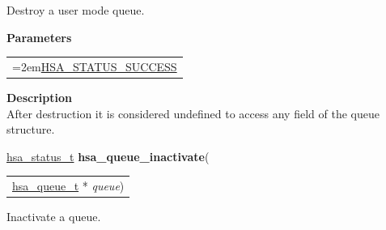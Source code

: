 \documentclass[final]{book}
\newcommand{\hsaarg}[1]{\textit{#1}}
\begin{document}
\begin{appendices}
\noindent{}
Destroy a user mode queue.

\noindent\textbf{Parameters}\\[-6mm]
\noindent\begin{longtable}{@{}>{\hangindent=2em}p{\textwidth}}
\hsaarg{queue}\\\hspace{2em}(in) Queue.
\end{longtable}
\vspace{-5mm}\noindent\textbf{Return Values}\\[-6mm]
\noindent\begin{longtable}{@{}>{\hangindent=2em}p{\linewidth}}
\hyperlink{group--status-1ggad755322e7ff95456520e8abdbe90d225ae382ea0c9c05cce5a60d0317375159cc}{HSA_STATUS_SUCCESS}
\end{longtable}
\vspace{-4mm}\noindent\textbf{Description}\\[1mm]
After destruction it is considered undefined to access any field of the queue structure. 


\noindent\begin{tcolorbox}[breakable,nobeforeafter,colframe=white,colback=lightgray,left=0mm]
\hyperlink{group--status-1gad755322e7ff95456520e8abdbe90d225}{hsa_status_t} \hypertarget{group--queue-1ga934a8d85f49106bcc1e331920798715b}{\textbf{hsa_queue_inactivate}}(
\vspace{-3.5mm}\begin{longtable}{@{}p{\textwidth}}
\hspace{1.7em}\hyperlink{group--queue-1gacbb2835331f18aee30ee441f07b3fc5a}{hsa_queue_t} * \hsaarg{queue})\end{longtable}

\end{tcolorbox}
Inactivate a queue.


\end{appendices}
\end{document}
